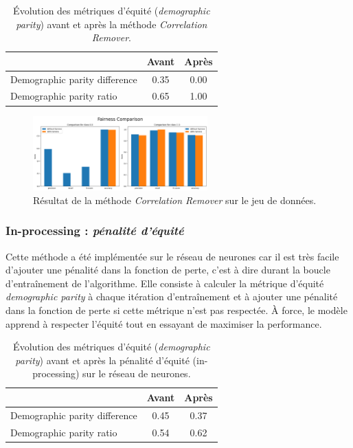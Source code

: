 \documentclass[12pt, letterpaper]{article}
\begin{document}
\begin{table}[h!]
    \centering
    \begin{tabular}{lcc}
        \hline
        & \textbf{Avant} & \textbf{Après} \\
        \hline
        Demographic parity difference & 0.35 & 0.00 \\
        Demographic parity ratio      & 0.65 & 1.00 \\
        \hline
    \end{tabular}
    \caption{Évolution des métriques d'équité (\emph{demographic parity}) avant et après la méthode \emph{Correlation Remover}.}
    \label{tab:correlation_remover_parity}
\end{table}

\begin{figure}[h]
    \centering
    \includegraphics[width=0.6\textwidth]{cr}
    \caption{Résultat de la méthode \emph{Correlation Remover} sur le jeu de données.}
    \label{fig:correlation}
\end{figure}

\subsubsection*{In-processing : \emph{pénalité d'équité}}
Cette méthode a été implémentée sur le réseau de neurones car il est très facile d'ajouter une pénalité dans 
la fonction de perte, c'est à dire durant la boucle d'entraînement de l'algorithme.
Elle consiste à calculer la métrique d'équité \emph{demographic parity} à chaque itération d'entraînement et à ajouter une pénalité dans la fonction de perte si cette métrique n'est pas respectée.
À force, le modèle apprend à respecter l'équité tout en essayant de maximiser la performance.

\begin{table}[h!]
    \centering
    \begin{tabular}{lcc}
        \hline
        & \textbf{Avant} & \textbf{Après} \\
        \hline
        Demographic parity difference & 0.45 & 0.37 \\
        Demographic parity ratio      & 0.54 & 0.62 \\
        \hline
    \end{tabular}
    \caption{Évolution des métriques d'équité (\emph{demographic parity}) avant et après la pénalité d'équité (in-processing) sur le réseau de neurones.}
\end{table}
\end{document}
